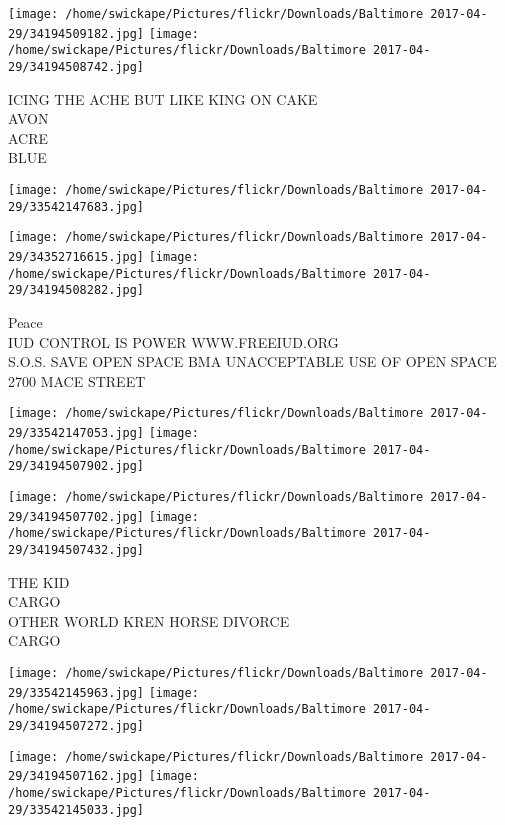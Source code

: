 \documentclass[10pt,letterpaper]{article}
\begin{document}
\texttt{[image: /home/swickape/Pictures/flickr/Downloads/Baltimore 2017-04-29/34194509182.jpg]}
\texttt{[image: /home/swickape/Pictures/flickr/Downloads/Baltimore 2017-04-29/34194508742.jpg]}

ICING THE ACHE BUT LIKE KING ON CAKE\\
AVON\\
ACRE\\
BLUE\\
\pagebreak

\texttt{[image: /home/swickape/Pictures/flickr/Downloads/Baltimore 2017-04-29/33542147683.jpg]}

\vspace{0.25in}
\texttt{[image: /home/swickape/Pictures/flickr/Downloads/Baltimore 2017-04-29/34352716615.jpg]}
\texttt{[image: /home/swickape/Pictures/flickr/Downloads/Baltimore 2017-04-29/34194508282.jpg]}

Peace\\
IUD CONTROL IS POWER WWW.FREEIUD.ORG\\
S.O.S. SAVE OPEN SPACE BMA UNACCEPTABLE USE OF OPEN SPACE 2700 MACE STREET\\
\pagebreak

\texttt{[image: /home/swickape/Pictures/flickr/Downloads/Baltimore 2017-04-29/33542147053.jpg]}
\texttt{[image: /home/swickape/Pictures/flickr/Downloads/Baltimore 2017-04-29/34194507902.jpg]}

\texttt{[image: /home/swickape/Pictures/flickr/Downloads/Baltimore 2017-04-29/34194507702.jpg]}
\texttt{[image: /home/swickape/Pictures/flickr/Downloads/Baltimore 2017-04-29/34194507432.jpg]}

THE KID\\
CARGO\\
OTHER WORLD KREN HORSE DIVORCE\\
CARGO\\
\pagebreak

\texttt{[image: /home/swickape/Pictures/flickr/Downloads/Baltimore 2017-04-29/33542145963.jpg]}
\texttt{[image: /home/swickape/Pictures/flickr/Downloads/Baltimore 2017-04-29/34194507272.jpg]}

\texttt{[image: /home/swickape/Pictures/flickr/Downloads/Baltimore 2017-04-29/34194507162.jpg]}
\texttt{[image: /home/swickape/Pictures/flickr/Downloads/Baltimore 2017-04-29/33542145033.jpg]}
\end{document}
